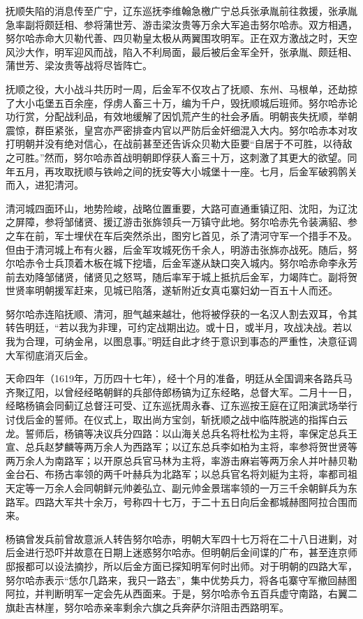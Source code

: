 抚顺失陷的消息传至广宁，辽东巡抚李维翰急檄广宁总兵张承胤前往救援，张承胤急率副将颇廷相、参将蒲世芳、游击梁汝贵等万余大军追击努尔哈赤。双方相遇，努尔哈赤命大贝勒代善、四贝勒皇太极从两翼围攻明军。正在双方激战之时，天空风沙大作，明军迎风而战，陷入不利局面，最后被后金军全歼，张承胤、颇廷相、蒲世芳、梁汝贵等战将尽皆阵亡。

抚顺之役，大小战斗共历时一周，后金军不仅攻占了抚顺、东州、马根单，还劫掠了大小屯堡五百余座，俘虏人畜三十万，编为千户，毁抚顺城后班师。努尔哈赤论功行赏，分配战利品，有效地缓解了因饥荒产生的社会矛盾。明朝丧失抚顺，举朝震惊，群臣紧张，皇宫亦严密排查内官以严防后金奸细混入大内。努尔哈赤本对攻打明朝并没有绝对信心，在战前甚至还告诉众贝勒大臣要“自居于不可胜，以待敌之可胜。”然而，努尔哈赤首战明朝即俘获人畜三十万，这刺激了其更大的欲望。同年五月，再攻取抚顺与铁岭之间的抚安等大小城堡十一座。七月，后金军破鸦鹘关而入，进犯清河。

清河城四面环山，地势险峻，战略位置重要，大路可直通重镇辽阳、沈阳，为辽沈之屏障，参将邹储贤、援辽游击张旆领兵一万镇守此地。努尔哈赤先令装满貂、参之车在前，军士埋伏在车后突然杀出，图穷匕首见，杀了清河守军一个措手不及。但由于清河城上布有火器，后金军攻城死伤千余人，明游击张旆亦战死。随后，努尔哈赤令士兵顶着木板在城下挖墙，后金军遂从缺口突入城内。努尔哈赤命李永芳前去劝降邹储贤，储贤见之怒骂，随后率军于城上抵抗后金军，力竭阵亡。副将贺世贤率明朝援军赶来，见城已陷落，遂斩附近女真屯寨妇幼一百五十人而还。

努尔哈赤连陷抚顺、清河，胆气越来越壮，他将被俘获的一名汉人割去双耳，令其转告明廷，“若以我为非理，可约定战期出边。或十日，或半月，攻战决战。若以我为合理，可纳金帛，以图息事。”明廷自此才终于意识到事态的严重性，决意征调大军彻底消灭后金。

天命四年（1619年，万历四十七年），经十个月的准备，明廷从全国调来各路兵马齐聚辽阳，以曾经经略朝鲜的兵部侍郎杨镐为辽东经略，总督大军。二月十一日，经略杨镐会同蓟辽总督汪可受、辽东巡抚周永春、辽东巡按王庭在辽阳演武场举行讨伐后金的誓师。在仪式上，取出尚方宝剑，斩抚顺之战中临阵脱逃的指挥白云龙。誓师后，杨镐等决议兵分四路：以山海关总兵名将杜松为主将，率保定总兵王宣、总兵赵梦麟等两万余人为西路军；以辽东总兵李如柏为主将，率参将贺世贤等两万余人为南路军；以开原总兵官马林为主将，率游击麻岩等两万余人并叶赫贝勒金台石、布扬古率领的两千叶赫兵为北路军；以总兵官名将刘綎为主将，率都司祖天定等一万余人会同朝鲜元帅姜弘立、副元帅金景瑞率领的一万三千余朝鲜兵为东路军。四路大军共十余万，号称四十七万，于二十五日向后金都城赫图阿拉合围而来。

杨镐曾发兵前曾故意派人转告努尔哈赤，明朝大军四十七万将在二十八日进剿，对后金进行恐吓并故意在日期上迷惑努尔哈赤。但明朝后金间谍的广布，甚至连京师邸报都可以设法摘抄，所以后金方面已探知明军何时出师。对于明朝的四路大军，努尔哈赤表示“恁尔几路来，我只一路去”，集中优势兵力，将各屯寨守军撤回赫图阿拉，并判断明军一定会先从西面来。于是，努尔哈赤令五百兵虚守南路，右翼二旗赴吉林崖，努尔哈赤亲率剩余六旗之兵奔萨尔浒阻击西路明军。

